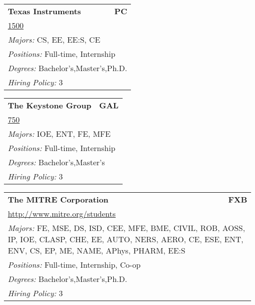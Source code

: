 \documentclass[twoside]{article}
\begin{document}
\begin{center}
\begin{multicols}{3}
\begin{FlushLeft}
\begin{minipage}{\columnwidth}
\end{minipage}
 
\begin{minipage}{\columnwidth}\begin{tabularx}{.95\columnwidth}{Xr}
                 {\Large\bf Texas Instruments} & {\Large\bf PC}\\
    \multicolumn{2}{p{.95\columnwidth}}{\url{1500}}\\
    \multicolumn{2}{p{.95\columnwidth}}{\emph{Majors:} CS, EE, EE:S, CE}\\
    \multicolumn{2}{p{.95\columnwidth}}{\emph{Positions:} Full-time, Internship}\\
    \multicolumn{2}{p{.95\columnwidth}}{\emph{Degrees:} Bachelor's,Master's,Ph.D.}\\
    \multicolumn{2}{p{.95\columnwidth}}{\emph{Hiring Policy:} 3}\\
    \end{tabularx}
    
\end{minipage}
 
\begin{minipage}{\columnwidth}\begin{tabularx}{.95\columnwidth}{Xr}
                 {\Large\bf The Keystone Group} & {\Large\bf GAL}\\
    \multicolumn{2}{p{.95\columnwidth}}{\url{750}}\\
    \multicolumn{2}{p{.95\columnwidth}}{\emph{Majors:} IOE, ENT, FE, MFE}\\
    \multicolumn{2}{p{.95\columnwidth}}{\emph{Positions:} Full-time, Internship}\\
    \multicolumn{2}{p{.95\columnwidth}}{\emph{Degrees:} Bachelor's,Master's}\\
    \multicolumn{2}{p{.95\columnwidth}}{\emph{Hiring Policy:} 3}\\
    \end{tabularx}
    
\end{minipage}
 
\begin{minipage}{\columnwidth}\begin{tabularx}{.95\columnwidth}{Xr}
                 {\Large\bf The MITRE Corporation} & {\Large\bf FXB}\\
    \multicolumn{2}{p{.95\columnwidth}}{\url{http://www.mitre.org/students}}\\
    \multicolumn{2}{p{.95\columnwidth}}{\emph{Majors:} FE, MSE, DS, ISD, CEE, MFE, BME, CIVIL, ROB, AOSS, IP, IOE, CLASP, CHE, EE, AUTO, NERS, AERO, CE, ESE, ENT, ENV, CS, EP, ME, NAME, APhys, PHARM, EE:S}\\
    \multicolumn{2}{p{.95\columnwidth}}{\emph{Positions:} Full-time, Internship, Co-op}\\
    \multicolumn{2}{p{.95\columnwidth}}{\emph{Degrees:} Bachelor's,Master's,Ph.D.}\\
    \multicolumn{2}{p{.95\columnwidth}}{\emph{Hiring Policy:} 3}\\
    \end{tabularx}
    

\end{minipage}
\end{FlushLeft}
\end{multicols}
\end{center}
\end{document}

